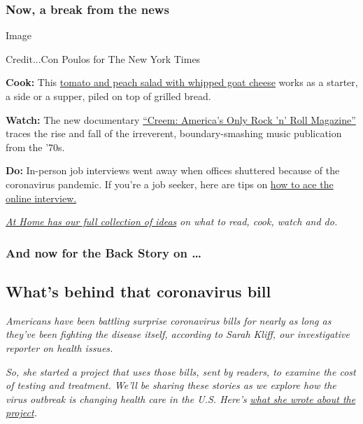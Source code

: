 \hypertarget{now-a-break-from-the-news}{%
\subsubsection{Now, a break from the
news}\label{now-a-break-from-the-news}}

Image

Credit...Con Poulos for The New York Times

\textbf{Cook:} This
\href{https://cooking.nytimes.com/recipes/1020367-tomato-and-peach-salad-with-whipped-goat-cheese}{tomato
and peach salad with whipped goat cheese} works as a starter, a side or
a supper, piled on top of grilled bread.

\textbf{Watch:} The new documentary
\href{https://www.nytimes.com/2020/08/03/arts/music/creem-magazine-documentary.html?action=click\&module=RelatedLinks\&pgtype=collection}{``Creem:
America's Only Rock 'n' Roll Magazine''} traces the rise and fall of the
irreverent, boundary-smashing music publication from the '70s.

\textbf{Do:} In-person job interviews went away when offices shuttered
because of the coronavirus pandemic. If you're a job seeker, here are
tips on
\href{https://www.nytimes.com/2020/08/03/business/online-job-interview-tips.html}{how
to ace the online interview.}

\href{https://www.nytimes.com/spotlight/at-home}{\emph{At Home has our
full collection of ideas}} \emph{on what to read, cook, watch and do.}

\hypertarget{and-now-for-the-back-story-on-}{%
\subsubsection{And now for the Back Story on
\ldots{}}\label{and-now-for-the-back-story-on-}}

\hypertarget{whats-behind-that-coronavirus-bill}{%
\subsection{What's behind that coronavirus
bill}\label{whats-behind-that-coronavirus-bill}}

\emph{Americans have been battling surprise coronavirus bills for nearly
as long as they've been fighting the disease itself, according to Sarah
Kliff, our investigative reporter on health issues.}

\emph{So, she started a project that uses those bills, sent by readers,
to examine the cost of testing and treatment. We'll be sharing these
stories as we explore how the virus outbreak is changing health care in
the U.S. Here's}
\href{https://www.nytimes.com/2020/08/03/reader-center/coronavirus-medical-bills.html}{\emph{what
she wrote about the project}}\emph{.}

